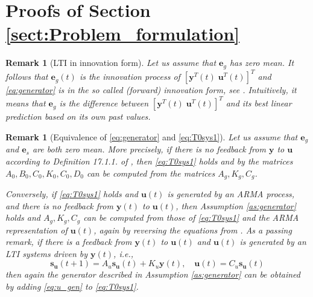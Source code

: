 \documentclass{article}
\def\rvu{{\mathbf{i}}}
\def\rvs{{\mathbf{s}}}
\def\rvu{{\mathbf{u}}}
\def\rvy{{\mathbf{y}}}
\newtheorem{remark}[theorem]{Remark}
\newcommand{\e}{\mathbf{e}}
\newcommand{\y}{\mathbf{y}}
\begin{document}
\section{Proofs of Section \ref{sect:Problem_formulation}}
\label{app:sect:Problem_formulation}
\begin{remark}[LTI in innovation form]
  \label{rem:innovation}
   Let us assume that $\e_g$ has zero mean. It follows
   that $\e_g(t)$ is the innovation process of $[\rvy^T(t)\;\rvu^T(t)]^T$
   and \eqref{eq:generator} is in the so called 
   (forward) innovation form, see
   \cite[Section 8.5.2]{Katayama:05}.
   Intuitively, it means that $\e_g$
   is the difference between $[\rvy^T(t)\;\rvu^T(t)]^T$ and its best linear prediction based on its own past values.
  \end{remark} 
\begin{remark}[Equivalence of \eqref{eq:generator} and \eqref{eq:T0sys1}]
  \label{rem:equiv_gen:proof}
Let us assume that $\e_g$ and $\e_s$ are both zero mean.
More precisely, if there is no feedback from $\rvy$ to $\rvu$ according to Definition 17.1.1. of \cite{LindquistBook},
then \eqref{eq:T0sys1} holds and by \cite{eringis2021optimal} the matrices $A_0,B_0,C_0,K_0,C_0,D_0$ can be computed from the matrices $A_g,K_g,C_g$. 

Conversely, if \eqref{eq:T0sys1} holds and $\rvu(t)$ is generated by an ARMA process, and there is no feedback from $\rvy(t)$ to $\rvu(t)$, then 
Assumption \ref{as:generator} holds and $A_g,K_g,C_g$  can be computed from those of \eqref{eq:T0sys1} and the ARMA representation of $\rvu(t)$, again by reversing the equations from
\cite{eringis2021optimal}. As a passing remark, if there is a feedback from $\rvy(t)$ to $\rvu(t)$ and  $\rvu(t)$ is generated by an LTI systems driven by $\y(t)$, i.e.,  
\begin{equation}\label{eq:u_gen}
    \rvs_\rvu(t+1)=A_u\rvs_\rvu(t)+K_u\y(t), \quad 
    \rvu(t)=C_u\rvs_\rvu(t) 
\end{equation}
then again the generator described in Assumption \ref{as:generator} can be obtained by adding \eqref{eq:u_gen} to \eqref{eq:T0sys1}. 
\end{remark} 
\end{document}
